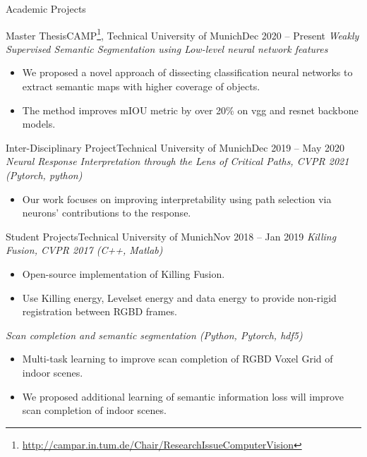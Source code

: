 \documentclass[]{mcdowellcv}
\begin{document}
    \makeheader
    
    \begin{cvsection}{Academic Projects}
    \begin{cvsubsection}[2]{Master Thesis}{CAMP\footnote{\href{http://campar.in.tum.de/Chair/ResearchIssueComputerVision}{http://campar.in.tum.de/Chair/ResearchIssueComputerVision}}, Technical University of Munich}{Dec 2020 -- Present}
    \textit{Weakly Supervised Semantic Segmentation using Low-level neural network features}
        \begin{itemize}
            \item We proposed a novel approach of dissecting classification neural networks to extract semantic maps with higher coverage of objects.
            \item The method improves mIOU metric by over 20\% on vgg and resnet backbone models.
        \end{itemize}
    \end{cvsubsection}
    
    \begin{cvsubsection}{Inter-Disciplinary Project}{Technical University of Munich}{Dec 2019 -- May 2020}
    \textit{Neural Response Interpretation through the Lens of Critical Paths, CVPR 2021 (Pytorch, python) \cite{khakzar-2021}}
        \begin{itemize}
        \item Our work focuses on improving interpretability using path selection via
neurons’ contributions to the response.
        \end{itemize}
    \end{cvsubsection}
    
    \begin{cvsubsection}{Student Projects}{Technical University of Munich}{Nov 2018 -- Jan 2019}
    \textit{Killing Fusion, CVPR 2017 (C++, Matlab) \cite{slavcheva2017killingfusion}}
        \begin{itemize}
        \item Open-source implementation of Killing Fusion.
        \item Use Killing energy, Levelset energy and data energy to provide non-rigid registration between RGBD frames.
        \end{itemize}
    \textit{Scan completion and semantic segmentation (Python, Pytorch, hdf5)}
        \begin{itemize}
        \item Multi-task learning to improve scan completion of RGBD Voxel Grid of indoor scenes.
        \item We proposed additional learning of semantic information loss will improve scan completion of indoor scenes.
        \end{itemize}
    \end{cvsubsection}
    
    \end{cvsection}
    
\end{document}
